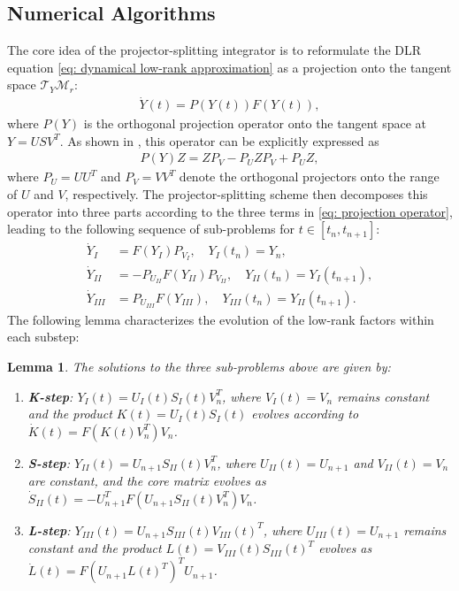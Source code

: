\documentclass[preprint,11pt]{elsarticle}
\newtheorem{lemma}{Lemma}[section]
\begin{document}
\subsection{Numerical Algorithms}
The core idea of the projector-splitting integrator is to reformulate the DLR equation \eqref{eq: dynamical low-rank approximation} as a projection onto the tangent space $\mathcal{T}_{Y}\mathcal{M}_r$:
\begin{align}\label{eq: projection form}
    \dot{Y}(t) = P(Y(t)) F(Y(t)),
\end{align}
where $P(Y)$ is the orthogonal projection operator onto the tangent space at $Y=USV^T$. As shown in \cite{lubichProjectorsplittingIntegratorDynamical2014}, this operator can be explicitly expressed as
\begin{align}\label{eq: projection operator}
    P(Y)Z = ZP_V - P_U ZP_V + P_U Z,
\end{align}
where $P_U = UU^T$ and $P_V = VV^T$ denote the orthogonal projectors onto the range of $U$ and $V$, respectively.
The projector-splitting scheme then decomposes this operator into three parts according to the three terms in \eqref{eq: projection operator}, leading to the following sequence of sub-problems for $t \in [t_n, t_{n+1}]$:
\begin{align}
    \dot{Y}_{I}   &= F(Y_{I}) P_{V_I}, \quad Y_I(t_n)=Y_n, \\
    \dot{Y}_{II}  &= -P_{U_{II}} F(Y_{II}) P_{V_{II}}, \quad Y_{II}(t_n)=Y_I(t_{n+1}), \\
    \dot{Y}_{III} &= P_{U_{III}} F(Y_{III}), \quad Y_{III}(t_n)=Y_{II}(t_{n+1}).
\end{align}
The following lemma characterizes the evolution of the low-rank factors within each substep:
\begin{lemma}
    The solutions to the three sub-problems above are given by:
    \begin{enumerate}
        \item \textbf{K-step}: $Y_I(t) = U_I(t) S_I(t) V_n^T$, where $V_I(t) = V_n$ remains constant and the product $K(t) = U_I(t) S_I(t)$ evolves according to $\dot{K}(t) = F(K(t) V_n^T) V_n$.
        \item \textbf{S-step}: $Y_{II}(t) = U_{n+1} S_{II}(t) V_n^T$, where $U_{II}(t) = U_{n+1}$ and $V_{II}(t) = V_n$ are constant, and the core matrix evolves as $\dot{S}_{II}(t) = -U_{n+1}^T F(U_{n+1} S_{II}(t) V_n^T) V_n$.
        \item \textbf{L-step}: $Y_{III}(t) = U_{n+1} S_{III}(t) V_{III}(t)^T$, where $U_{III}(t) = U_{n+1}$ remains constant and the product $L(t) = V_{III}(t) S_{III}(t)^T$ evolves as $\dot{L}(t) = F(U_{n+1} L(t)^T)^T U_{n+1}$.
    \end{enumerate}
\end{lemma}
\end{document}

